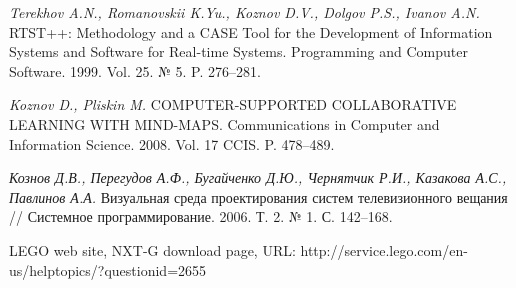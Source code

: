 \documentclass[a4paper]{article}
\begin{document}
\begin{thebibliography}{9001}
   \emph{Terekhov A.N., Romanovskii K.Yu., Koznov D.V., Dolgov P.S., Ivanov A.N.} RTST++: Methodology and a CASE Tool for the Development of Information Systems and Software for Real-time Systems. Programming and Computer Software. 1999. Vol. 25. № 5. P. 276--281. 

   \emph{Koznov D., Pliskin M.} COMPUTER-SUPPORTED COLLABORATIVE LEARNING WITH MIND-MAPS. Communications in Computer and Information Science. 2008. Vol. 17 CCIS. P. 478--489.

   \emph{Кознов Д.В., Перегудов А.Ф., Бугайченко Д.Ю., Чернятчик Р.И., Казакова А.С., Павлинов А.А.} Визуальная среда проектирования систем телевизионного вещания // Системное программирование. 2006. Т. 2. № 1. С. 142--168.

   LEGO web site, NXT-G download page, URL: http://service.lego.com/en-us/helptopics/?questionid=2655
	
\end{thebibliography}
\end{document}
